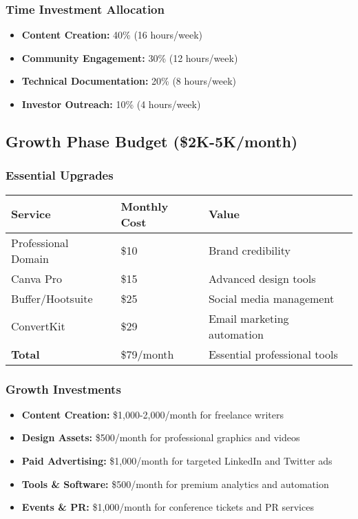\documentclass[12pt,a4paper]{article}
\begin{document}
\begin{itemize}
\subsubsection{Time Investment Allocation}
\begin{itemize}
    \item \textbf{Content Creation:} 40\% (16 hours/week)
    \item \textbf{Community Engagement:} 30\% (12 hours/week)
    \item \textbf{Technical Documentation:} 20\% (8 hours/week)
    \item \textbf{Investor Outreach:} 10\% (4 hours/week)
\end{itemize}

\subsection{Growth Phase Budget (\$2K-5K/month)}

\subsubsection{Essential Upgrades}
\begin{center}
\begin{tabular}{|l|l|l|}
\hline
\textbf{Service} & \textbf{Monthly Cost} & \textbf{Value} \\
\hline
Professional Domain & \$10 & Brand credibility \\
\hline
Canva Pro & \$15 & Advanced design tools \\
\hline
Buffer/Hootsuite & \$25 & Social media management \\
\hline
ConvertKit & \$29 & Email marketing automation \\
\hline
\textbf{Total} & \$79/month & Essential professional tools \\
\hline
\end{tabular}
\end{center}

\subsubsection{Growth Investments}
\begin{itemize}
    \item \textbf{Content Creation:} \$1,000-2,000/month for freelance writers
    \item \textbf{Design Assets:} \$500/month for professional graphics and videos
    \item \textbf{Paid Advertising:} \$1,000/month for targeted LinkedIn and Twitter ads
    \item \textbf{Tools \& Software:} \$500/month for premium analytics and automation
    \item \textbf{Events \& PR:} \$1,000/month for conference tickets and PR services
\end{itemize}


\end{itemize}
\end{document}
